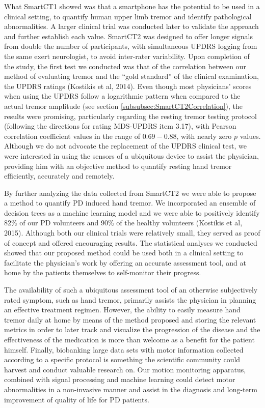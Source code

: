What \gls{SmartCT1} showed was that a smartphone has the potential to be used in a clinical setting, to quantify human upper limb tremor and identify pathological abnormalities. A larger clinical trial was conducted later to validate the approach and further establish each value. \gls{SmartCT2} was designed to offer longer signals from double the number of participants, with simultaneous \gls{UPDRS} logging from the same exert neurologist, to avoid inter-rater variability. Upon completion of the study, the first test we conducted was that of the correlation between our method of evaluating tremor and the ``gold standard'' of the clinical examination, the \gls{UPDRS} ratings (Kostikis et al, 2014). Even though most physicians' scores when using the \gls{UPDRS} follow a logarithmic pattern when compared to the actual tremor amplitude (see section \ref{subsubsec:SmartCT2Correlation}), the results were promising, particularly regarding the resting tremor testing protocol (following the directions for rating \gls{MDS}-\gls{UPDRS} item 3.17), with Pearson correlation coefficient values in the range of $0.69 - 0.88$, with nearly zero $p$ values. Although we do not advocate the replacement of the \gls{UPDRS} clinical test, we were interested in using the sensors of a ubiquitous device to assist the physician, providing him with an objective method to quantify resting hand tremor efficiently, accurately and remotely. 

By further analyzing the data collected from \gls{SmartCT2} we were able to propose a method to quantify \gls{PD} induced hand tremor. We incorporated an ensemble of decision trees as a machine learning model and we were able to positively identify 82\% of our \gls{PD} volunteers and 90\% of the healthy volunteers (Kostikis et al, 2015). Although both our clinical trials were relatively small, they served as proof of concept and offered encouraging results. The statistical analyses we conducted showed that our proposed method could be used both in a clinical setting to facilitate the physician's work by offering an accurate assessment tool, and at home by the patients themselves to self-monitor their progress. 

The availability of such a ubiquitous assessment tool of an otherwise subjectively rated symptom, such as hand tremor, primarily assists the physician in planning an effective treatment regimen. However, the ability to easily measure hand tremor daily at home by means of the method proposed and storing the relevant metrics in order to later track and visualize the progression of the disease and the effectiveness of the medication is more than welcome as a benefit for the patient himself. Finally, biobanking large data sets with motor information collected according to a specific protocol is something the scientific community could harvest and conduct valuable research on. Our motion monitoring apparatus, combined with signal processing and machine learning could detect motor abnormalities in a non-invasive manner and assist in the diagnosis and long-term improvement of quality of life for PD patients. 
